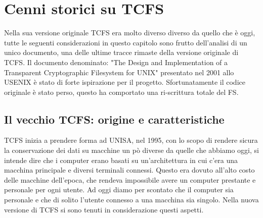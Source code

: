 \chapter{Cenni storici su TCFS}
Nella sua versione originale TCFS era molto diverso diverso da quello che è oggi, tutte le seguenti considerazioni in questo capitolo sono frutto dell'analisi di un unico documento, una delle ultime tracce rimaste della versione originale di TCFS. Il documento denominato: "The Design and Implementation of a Transparent Cryptographic Filesystem for UNIX" presentato nel 2001 allo USENIX è stato di forte ispirazione per il progetto. Sfortunatamente il codice originale è stato perso, questo ha comportato una ri-scrittura totale del FS.

\section{Il vecchio TCFS: origine e caratteristiche}
TCFS inizia a prendere forma ad UNISA, nel 1995, con lo scopo di rendere sicura la conservazione dei dati su macchine un pò diverse da quelle che abbiamo oggi, si intende dire che i computer erano basati su un’architettura in cui c’era una macchina principale e diversi terminali connessi. Questo era dovuto all’alto costo delle macchine dell’epoca, che rendeva impossibile avere un computer prestante e personale per ogni utente. Ad oggi diamo per scontato che il computer sia personale e che di solito l'utente connesso a una macchina sia singolo. Nella nuova versione di TCFS si sono tenuti in considerazione questi aspetti.

